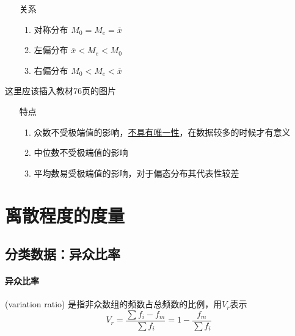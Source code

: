 \documentclass[UTF8,10pt]{book}
\begin{document}
                    \begin{itemize}
                        \item [关系] {
                            \begin{enumerate}
                                \item 对称分布 $ M_0 = M_e = \overline{x} $
                                \item 左偏分布 $ \overline{x} < M_e < M_0 $
                                \item 右偏分布 $ M_0 < M_e < \overline{x} $
                            
                            \end{enumerate}
                        }
                    \end{itemize}
                    {\kaishu 这里应该插入教材76页的图片}
                    \begin{itemize}
                        \item [特点] {
                            \begin{enumerate}
                                \item 众数不受极端值的影响，\underline{不具有唯一性}，在数据较多的时候才有意义
                                \item 中位数不受极端值的影响
                                \item 平均数易受极端值的影响，对于偏态分布其代表性较差
                            
                            \end{enumerate}
                        }
                    \end{itemize}

    \section{离散程度的度量}
        \subsection{分类数据：异众比率}
                \paragraph{异众比率} (variation ratio) 是指非众数组的频数占总频数的比例，用$V_r$表示
                $$ V_r
                = \frac{\sum f_i - f_m}{\sum f_i}
                = 1- \frac{f_m}{\sum f_i}
                $$
\end{document}
